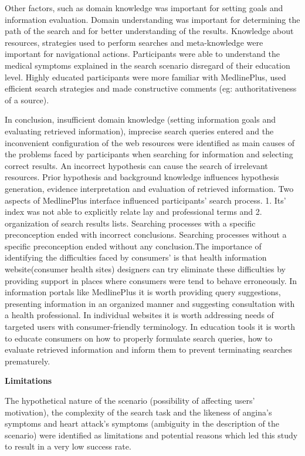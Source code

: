 \documentclass[]{article}
\begin{document}
Other factors, such as domain knowledge was important for setting goals and information evaluation. Domain understanding was important for determining the path of the search and for better understanding of the results. Knowledge about resources, strategies used to perform searches and meta-knowledge were important for navigational actions. Participants were able to understand the medical symptoms explained in the search scenario disregard of their education level. Highly educated participants were more familiar with MedlinePlus, used efficient search strategies and made constructive comments (eg: authoritativeness of a source).  

In conclusion, insufficient domain knowledge (setting information goals and evaluating retrieved information), imprecise search queries entered and the inconvenient configuration of the web resources were identified as main causes of the problems faced by participants when searching for information and selecting correct results. An incorrect hypothesis can cause the search of irrelevant resources. Prior hypothesis and background knowledge influences hypothesis generation, evidence interpretation and evaluation of retrieved information. Two aspects of MedlinePlus interface influenced participants’ search process. 1. Its' index was not able to explicitly relate lay and professional terms and 2. organization of search results lists. Searching processes with a specific preconception ended with incorrect conclusions. Searching processes without a specific preconception ended without any conclusion.The importance of identifying the difficulties faced by consumers’ is that health information website(consumer health sites) designers can try eliminate these difficulties by providing support in places where consumers were tend to behave erroneously. In information portals like MedlinePlus it is worth providing query suggestions, presenting information in an organized manner and suggesting consultation with a health professional. In individual websites it is worth addressing needs of targeted users with consumer-friendly terminology. In education tools it is worth to educate consumers on how to properly formulate search queries, how to evaluate retrieved information and inform them to prevent terminating searches prematurely.

\textbf{Limitations}

The hypothetical nature of the scenario (possibility of affecting users’ motivation), the complexity of the search task and the likeness of angina's symptoms and heart attack's symptoms (ambiguity in the description of the scenario) were identified as limitations and potential reasons which led this study to result in a very low success rate. 
\end{document}
